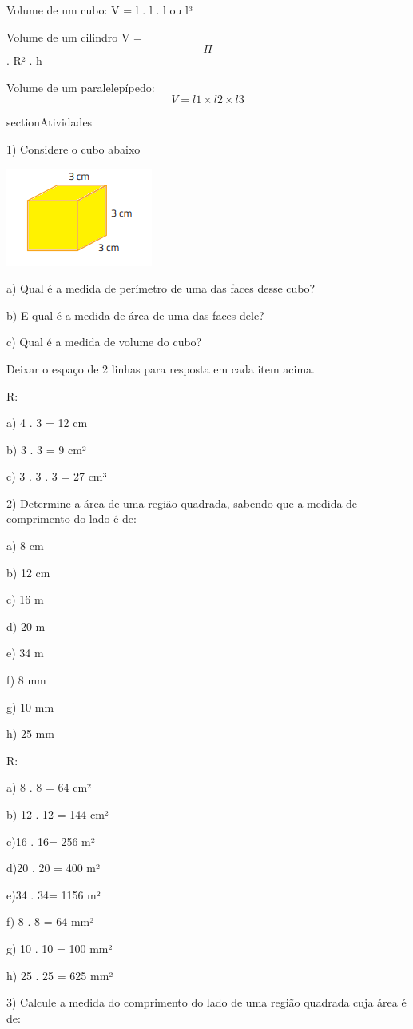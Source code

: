 Volume de um cubo: V = l . l . l ou l³

Volume de um cilindro V = \[\Pi\] . R² . h

Volume de um paralelepípedo: \[V = l1 \times l2 \times l3\]

section{Atividades}

1) Considere o cubo abaixo

\includegraphics[width=1.89583in,height=1.27083in]{./imgSAEB_8_MAT/media/image42.png}

a) Qual é a medida de perímetro de uma das faces desse cubo?

b) E qual é a medida de área de uma das faces dele?

c) Qual é a medida de volume do cubo?

Deixar o espaço de 2 linhas para resposta em cada item acima.

R:

a) 4 . 3 = 12 cm

b) 3 . 3 = 9 cm²

c) 3 . 3 . 3 = 27 cm³

2) Determine a área de uma região quadrada, sabendo que a medida de
comprimento do lado é de:

a) 8 cm

b) 12 cm

c) 16 m

d) 20 m

e) 34 m

f) 8 mm

g) 10 mm

h) 25 mm

R:

a) 8 . 8 = 64 cm²

b) 12 . 12 = 144 cm²

c)16 . 16= 256 m²

d)20 . 20 = 400 m²

e)34 . 34= 1156 m²

f) 8 . 8 = 64 mm²

g) 10 . 10 = 100 mm²

h) 25 . 25 = 625 mm²

3) Calcule a medida do comprimento do lado de uma região quadrada cuja
área é de:


